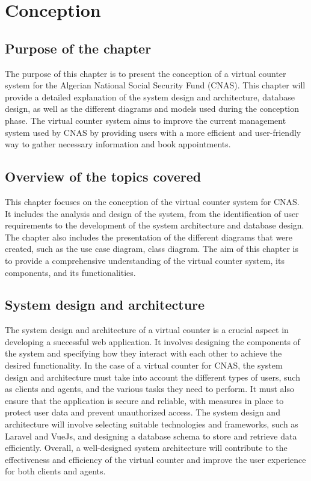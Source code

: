 \chapter{Conception}
\section{Purpose of the chapter}
The purpose of this chapter is to present the conception of a virtual counter system for the Algerian National Social Security Fund (CNAS). This chapter will provide a detailed explanation of the system design and architecture, database design, as well as the different diagrams and models used during the conception phase. The virtual counter system aims to improve the current management system used by CNAS by providing users with a more efficient and user-friendly way to gather necessary information and book appointments.
\section {Overview of the topics covered}
This chapter focuses on the conception of the virtual counter system for CNAS. It includes the analysis and design of the system, from the identification of user requirements to the development of the system architecture and database design. The chapter also includes the presentation of the different diagrams that were created, such as the use case diagram, class diagram.
The aim of this chapter is to provide a comprehensive understanding of the virtual counter system, its components, and its functionalities.

\section{System design and architecture}
The system design and architecture of a virtual counter is a crucial aspect in developing a successful web application. It involves designing the components of the system and specifying how they interact with each other to achieve the desired functionality. In the case of a virtual counter for CNAS, the system design and architecture must take into account the different types of users, such as clients and agents, and the various tasks they need to perform. It must also ensure that the application is secure and reliable, with measures in place to protect user data and prevent unauthorized access. The system design and architecture will involve selecting suitable technologies and frameworks, such as Laravel and VueJs, and designing a database schema to store and retrieve data efficiently. Overall, a well-designed system architecture will contribute to the effectiveness and efficiency of the virtual counter and improve the user experience for both clients and agents.

